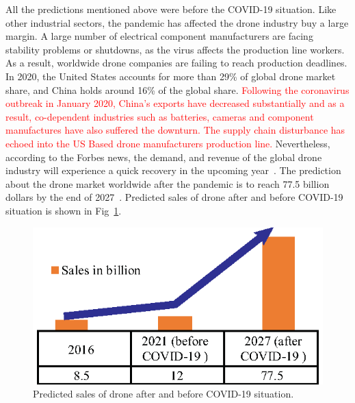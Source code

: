 All the predictions mentioned above were before the COVID-19 situation. Like other industrial sectors, the pandemic has affected the drone industry buy a large margin. A large number of electrical component manufacturers are facing stability problems or shutdowns, as the virus affects the production line workers. As a result, worldwide drone companies are failing to reach production deadlines. In 2020, the United States accounts for more than 29\% of global drone market share, and China holds around 16\% of the global share. 
\textcolor{red}{
Following the coronavirus outbreak in January 2020, China's exports have decreased substantially and as a result, co-dependent industries such as batteries, cameras and component manufactures have also suffered the downturn.
The supply chain disturbance has echoed into the US Based drone manufacturers production line.}
Nevertheless, according to the Forbes news, the demand, and revenue of the global drone industry will experience a quick recovery in the upcoming year~\cite{droneforbes}. The prediction about the drone market worldwide after the pandemic is to reach 77.5 billion dollars by the end of 2027~\cite{droneglobenewswire}. Predicted sales of drone after and before COVID-19 situation is shown in Fig~\ref{dronesale}.
\begin{figure}[h!]
\centering
\includegraphics[width=.8\linewidth]{figure/dronesale.eps}
\caption{Predicted sales of drone after and before COVID-19 situation.}
\label{dronesale}
\end{figure}